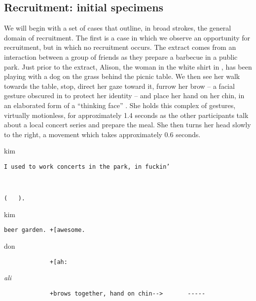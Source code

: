 \documentclass[output=paper,nonflat,modfont,draft]{langsci/langscibook}
\begin{document}
\subsection{Recruitment: initial specimens}
We will begin with a set of cases that outline, in broad strokes, the general domain of recruitment. The first is a case in which we observe an opportunity for recruitment, but in which no recruitment occurs. The extract comes from an interaction between a group of friends as they prepare a barbecue in a public park. Just prior to the extract, Alison, the woman in the white shirt in , has been playing with a dog on the grass behind the picnic table. We then see her walk towards the table, stop, direct her gaze toward it, furrow her brow -- a facial gesture obscured in  to protect her identity -- and place her hand on her chin, in an elaborated form of a “thinking face” \citep{GoodwinGoodwin1986}. She holds this complex of gestures, virtually motionless, for approximately 1.4 seconds as the other participants talk about a local concert series and prepare the meal. She then turns her head slowly to the right, a movement which takes approximately 0.6 seconds.


\begin{transbox}{1}{kim}
\begin{verbatim}
I used to work concerts in the park, in fuckin’
\end{verbatim}
\end{transbox}

\begin{transbox}{2}{~}
\begin{verbatim}
(   ).
\end{verbatim}
\end{transbox}


\begin{transbox}{4}{kim}
\begin{verbatim}
beer garden. +[awesome.
\end{verbatim}
\end{transbox}

\begin{transbox}{5}{don}
\begin{verbatim}
             +[ah:
\end{verbatim}
\end{transbox}

\begin{transbox}{6}{\textit{ali}}
\begin{verbatim}
             +brows together, hand on chin-->       -----
\end{verbatim}
\end{transbox}
\end{document}
